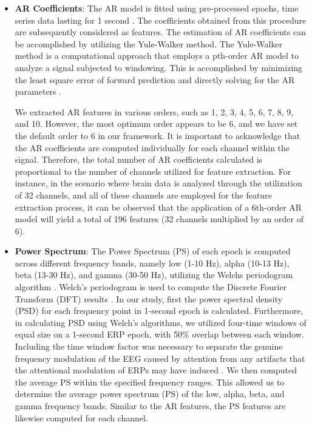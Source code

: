 \begin{itemize}
\item \textbf{\large AR Coefficients}: 
The AR model is fitted using pre-processed epochs, time series data lasting for 1 second \cite{arias2023performance}. The coefficients obtained from this procedure are subsequently considered as features. The estimation of AR coefficients can be accomplished by utilizing the Yule-Walker method. The Yule-Walker method is a computational approach that employs a pth-order AR model to analyze a signal subjected to windowing. This is accomplished by minimizing the least square error of forward prediction and directly solving for the AR parameters \cite{pardey1996review}.
\smallskip

We extracted AR features in various orders, such as 1, 2, 3, 4, 5, 6, 7, 8, 9, and 10. However, the most optimum order appears to be 6, and we have set the default order to 6 in our framework. It is important to acknowledge that the AR coefficients are computed individually for each channel within the signal. Therefore, the total number of AR coefficients calculated is proportional to the number of channels utilized for feature extraction. For instance, in the scenario where brain data is analyzed through the utilization of 32 channels, and all of these channels are employed for the feature extraction process, it can be observed that the application of a 6th-order AR model will yield a total of 196 features (32 channels multiplied by an order of 6).  

\item \textbf{\large Power Spectrum}: The Power Spectrum (PS) of each epoch is computed across different frequency bands, namely low (1-10 Hz), alpha (10-13 Hz), beta (13-30 Hz), and gamma (30-50 Hz), utilizing the Welchs periodogram algorithm \cite{arias2023performance}. Welch's periodogram is used to compute the Discrete Fourier Transform (DFT) results \cite{survey_brain_biometrics}. In our study, first the power spectral density (PSD) for each frequency point in 1-second epoch is calculated. Furthermore, in calculating PSD using Welch's algorithms, we utilized four-time windows of equal size on a 1-second ERP epoch, with 50$\%$ overlap between each window. Including the time window factor was necessary to separate the genuine frequency modulation of the EEG caused by attention from any artifacts that the attentional modulation of ERPs may have induced \cite{comez1998frequency}. We then computed the average PS within the specified frequency ranges.  This allowed us to determine the average power spectrum (PS) of the low, alpha, beta, and gamma frequency bands. Similar to the AR features, the PS features are likewise computed for each channel.    


\end{itemize}
